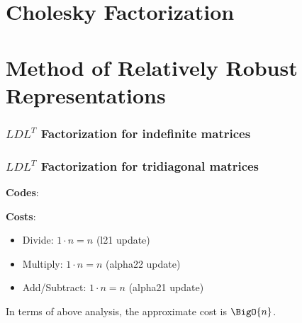 \documentclass[11pt,a4paper]{article}
\begin{document}
\begin{titlepage}
    \maketitle
\end{titlepage}
\begin{center} 
    \tableofcontents  
\end{center}
\newpage
\part{Cholesky Factorization}
\section{}

\newpage
\part{Method of Relatively Robust Representations}
\setcounter{section}{0}
\section{$LDL^T$ Factorization for indefinite matrices}

\newpage

\section{$LDL^T$ Factorization for tridiagonal matrices}
\textbf{Codes}:


\noindent
\textbf{Costs}: 
\begin{itemize}
    \item Divide: $ 1 \cdot n = n$ (l21 update)  
    \item Multiply: $1 \cdot n = n$ (alpha22 update)
    \item Add/Subtract: $1 \cdot n = n$ (alpha21 update) 
\end{itemize}
In terms of above analysis, the approximate cost is $\BigO{n}$. \\
\end{document}
